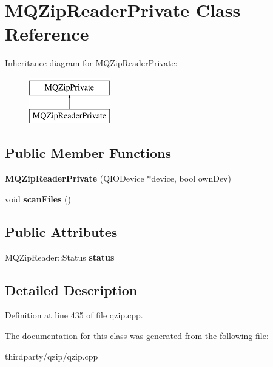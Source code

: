 \hypertarget{class_m_q_zip_reader_private}{}\section{M\+Q\+Zip\+Reader\+Private Class Reference}
\label{class_m_q_zip_reader_private}
Inheritance diagram for M\+Q\+Zip\+Reader\+Private\+:\begin{figure}[H]
\begin{center}
\leavevmode
\includegraphics[height=2.000000cm]{class_m_q_zip_reader_private}
\end{center}
\end{figure}
\subsection*{Public Member Functions}
\begin{DoxyCompactItemize}
\item 
\mbox{\label{class_m_q_zip_reader_private_a0c77e9d4edd9b0ae2c502c0e2bf4fae3}} 
{\bfseries M\+Q\+Zip\+Reader\+Private} (Q\+I\+O\+Device $\ast$device, bool own\+Dev)
\item 
\mbox{\label{class_m_q_zip_reader_private_a03e933b1fd2b15e727332c2219c315bd}} 
void {\bfseries scan\+Files} ()
\end{DoxyCompactItemize}
\subsection*{Public Attributes}
\begin{DoxyCompactItemize}
\item 
\mbox{\label{class_m_q_zip_reader_private_aad23c55d1abf657ec89de3b14f21d3ba}} 
M\+Q\+Zip\+Reader\+::\+Status {\bfseries status}
\end{DoxyCompactItemize}


\subsection{Detailed Description}


Definition at line 435 of file qzip.\+cpp.



The documentation for this class was generated from the following file\+:\begin{DoxyCompactItemize}
\item 
thirdparty/qzip/qzip.\+cpp\end{DoxyCompactItemize}
